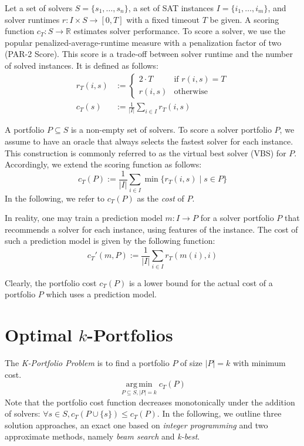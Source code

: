 \documentclass[conference]{IEEEtran}
\DeclareMathOperator*{\argmin}{arg\,min}
\begin{document}
Let a set of solvers $S = \{s_1, \dots, s_n\}$, a set of SAT instances $I = \{i_1, \dots, i_m\}$, and solver runtimes $r: I \times S \rightarrow [0, T]$ with a fixed timeout $T$ be given.
A scoring function $c_T: S \rightarrow \mathbb{R}$ estimates solver performance. 
To score a solver, we use the popular penalized-average-runtime measure with a penalization factor of two (PAR-2 Score). 
This score is a trade-off between solver runtime and the number of solved instances.
It is defined as follows:%
\begin{align}
r_T(i,s) &:= \begin{cases}
	2 \cdot T & \text{if }r(i,s) = T\\
	r(i,s) & \text{otherwise}
\end{cases} \tag*{Penalized Runtimes}\\[.5em]
c_T(s) &:= \frac{1}{|I|} \sum_{i \in I}{r_T(i,s)} \tag*{PAR-2 Score}
\end{align}

A portfolio $P \subseteq S$ is a non-empty set of solvers.
To score a solver portfolio $P$, we assume to have an oracle that always selects the fastest solver for each instance. 
This construction is commonly referred to as the virtual best solver (VBS) for $P$. 
Accordingly, we extend the scoring function as follows:%
$$
	c_{T}(P) := \frac{1}{|I|} \sum\limits_{i \in I}{\min\{r_T(i,s) \mid s \in P\}}
$$
In the following, we refer to $c_{T}(P)$ as the \emph{cost} of $P$. 

In reality, one may train a prediction model $m : I \rightarrow P$ for a solver portfolio $P$ that recommends a solver for each instance, using features of the instance. 
The cost of such a prediction model is given by the following function:%
$$
	c_{T}'(m,P) := \frac{1}{|I|} \sum\limits_{i \in I}{r_T(m(i),i)}
$$

Clearly, the portfolio cost $c_{T}(P)$ is a lower bound for the actual cost of a portfolio $P$ which uses a prediction model.

\section{Optimal \texorpdfstring{$k$}{k}-Portfolios} %
\label{sec:approach}

The \emph{K-Portfolio Problem} is to find a portfolio $P$ of size $|P| = k$ with minimum cost.%
$$
\argmin\limits_{P \subseteq S, |P| = k} c_{T}(P)
$$
Note that the portfolio cost function decreases monotonically under the addition of solvers: $\forall s \in S, c_{T}(P \cup \{s\}) \leq c_{T}(P)$. 
In the following, we outline three solution approaches, an exact one based on \emph{integer programming} and two approximate methods, namely \emph{beam search} and \emph{k-best}. 
\end{document}
